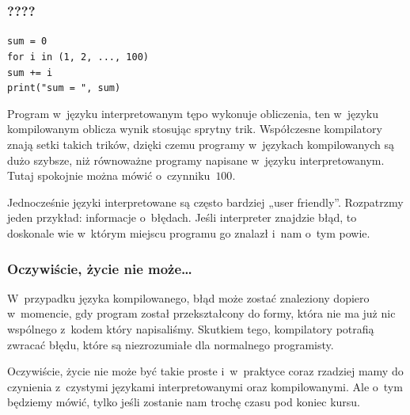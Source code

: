 \documentclass[10pt,t]{beamer}
\begin{document}
\begin{frame}
  \frametitle{????}


  \texttt{sum = 0} \\

  \texttt{for i in (1, 2, ..., 100)} \\
  \hphantom{aaaa} \texttt{sum += i} \\

  \texttt{print("sum = ", sum)}

  Program w~języku interpretowanym tępo wykonuje obliczenia, ten
  w~języku kompilowanym oblicza wynik stosując sprytny trik. Współczesne
  kompilatory znają setki takich trików, dzięki czemu programy w~językach
  kompilowanych są \alert{dużo} szybsze, niż równoważne programy napisane
  w~języku interpretowanym. Tutaj spokojnie można mówić o~czynniku~$100$.

  Jednocześnie języki interpretowane są często bardziej „user friendly”.
  Rozpatrzmy jeden przykład: informacje o~błędach. Jeśli interpreter
  znajdzie błąd, to doskonale wie w~którym miejscu programu go znalazł
  i~nam o~tym powie.

\end{frame}





\begin{frame}
  \frametitle{Oczywiście, życie nie może\ldots}


  W~przypadku języka kompilowanego, błąd może zostać znaleziony dopiero
  w~momencie, gdy program został przekształcony do formy, która
  nie ma już nic wspólnego z~kodem który napisaliśmy. Skutkiem tego,
  kompilatory potrafią zwracać błędu, które są niezrozumiałe dla normalnego
  programisty.

  Oczywiście, życie nie może być takie proste i~w~praktyce coraz rzadziej
  mamy do czynienia z~czystymi językami interpretowanymi oraz kompilowanymi.
  Ale o~tym będziemy mówić, tylko jeśli zostanie nam trochę czasu pod
  koniec kursu.

\end{frame}







\end{document}
